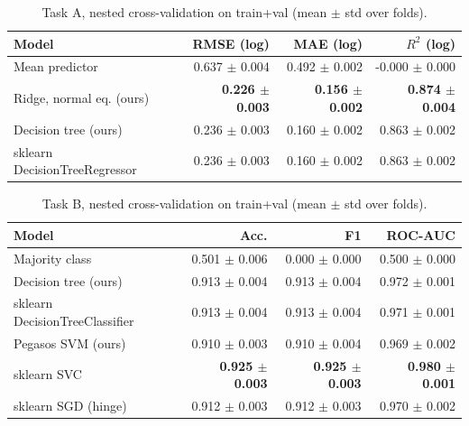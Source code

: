 \begin{table}[t]
\centering\small
\caption{Task A, nested cross-validation on train+val (mean $\pm$ std over folds).}\label{tab:cv_a}
\begin{tabular}{lrrr}
\toprule
Model & RMSE (log) & MAE (log) & $R^2$ (log) \\
\midrule
Mean predictor & 0.637 $\pm$ 0.004 & 0.492 $\pm$ 0.002 & -0.000 $\pm$ 0.000 \\
Ridge, normal eq. (ours) & \textbf{0.226 $\pm$ 0.003} & \textbf{0.156 $\pm$ 0.002} & \textbf{0.874 $\pm$ 0.004} \\
Decision tree (ours) & 0.236 $\pm$ 0.003 & 0.160 $\pm$ 0.002 & 0.863 $\pm$ 0.002 \\
sklearn DecisionTreeRegressor & 0.236 $\pm$ 0.003 & 0.160 $\pm$ 0.002 & 0.863 $\pm$ 0.002 \\
\bottomrule
\end{tabular}
\end{table}

\begin{table}[t]
\centering\small
\caption{Task B, nested cross-validation on train+val (mean $\pm$ std over folds).}\label{tab:cv_b}
\begin{tabular}{lrrr}
\toprule
Model & Acc. & F1 & ROC-AUC \\
\midrule
Majority class & 0.501 $\pm$ 0.006 & 0.000 $\pm$ 0.000 & 0.500 $\pm$ 0.000 \\
Decision tree (ours) & 0.913 $\pm$ 0.004 & 0.913 $\pm$ 0.004 & 0.972 $\pm$ 0.001 \\
sklearn DecisionTreeClassifier & 0.913 $\pm$ 0.004 & 0.913 $\pm$ 0.004 & 0.971 $\pm$ 0.001 \\
Pegasos SVM (ours) & 0.910 $\pm$ 0.003 & 0.910 $\pm$ 0.004 & 0.969 $\pm$ 0.002 \\
sklearn SVC & \textbf{0.925 $\pm$ 0.003} & \textbf{0.925 $\pm$ 0.003} & \textbf{0.980 $\pm$ 0.001} \\
sklearn SGD (hinge) & 0.912 $\pm$ 0.003 & 0.912 $\pm$ 0.003 & 0.970 $\pm$ 0.002 \\
\bottomrule
\end{tabular}
\end{table}
